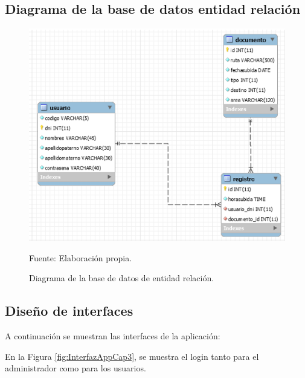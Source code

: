 \subsection{Diagrama de la base de datos entidad relación}
\begin{figure}[h!]
	\centering
		\includegraphics[scale=0.8]{imagenes/entidadrelacion.png}
		\caption{Diagrama de la base de datos de entidad relación.}
	\begin{center}
    Fuente: Elaboración propia.
    \end{center}
	\label{fig:entidadrelacion}
\end{figure}
\subsection{Diseño de interfaces}
A continuación se muestran las interfaces de la aplicación:

En la Figura \ref{fig:InterfazAppCap3}, se muestra el login tanto para el administrador como para los usuarios.


